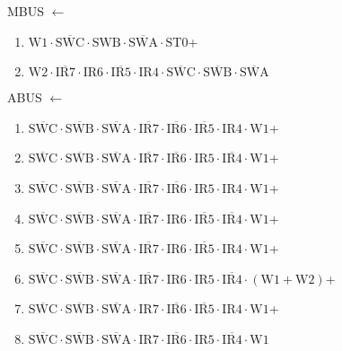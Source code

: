 \documentclass[UTF8]{ctexart}
\begin{document}
MBUS $\leftarrow$
\begin{enumerate}[\indent\indent]
	\item $\text{W1} \cdot \overline{\text{SWC}} \cdot \text{SWB} \cdot \overline{\text{SWA}} \cdot \text{ST0}$+
	\item $\text{W2} \cdot \overline{\text{IR7}} \cdot \text{IR6} \cdot \overline{\text{IR5}} \cdot \text{IR4} \cdot \overline{\text{SWC}} \cdot\overline{\text{SWB}}\cdot \overline{\text{SWA}}$
\end{enumerate}

ABUS $\leftarrow$
\begin{enumerate}[\indent\indent]
	\item $\overline{\text{SWC}} \cdot\overline{\text{SWB}}\cdot \overline{\text{SWA}} \cdot \overline{\text{IR7}} \cdot \overline{\text{IR6}} \cdot \overline{\text{IR5}} \cdot \text{IR4} \cdot \text{W1}$+
	\item $\overline{\text{SWC}} \cdot\overline{\text{SWB}}\cdot \overline{\text{SWA}} \cdot \overline{\text{IR7}} \cdot \overline{\text{IR6}} \cdot \text{IR5} \cdot \overline{\text{IR4}} \cdot \text{W1}$+
	\item $\overline{\text{SWC}} \cdot\overline{\text{SWB}}\cdot \overline{\text{SWA}} \cdot \overline{\text{IR7}} \cdot \overline{\text{IR6}} \cdot \text{IR5} \cdot \text{IR4} \cdot \text{W1}$+
	\item $\overline{\text{SWC}} \cdot\overline{\text{SWB}}\cdot \overline{\text{SWA}} \cdot \overline{\text{IR7}} \cdot \text{IR6} \cdot \overline{\text{IR5}} \cdot \overline{\text{IR4}} \cdot \text{W1}$+
	\item $\overline{\text{SWC}} \cdot\overline{\text{SWB}}\cdot \overline{\text{SWA}} \cdot \overline{\text{IR7}} \cdot \text{IR6} \cdot \overline{\text{IR5}} \cdot \text{IR4} \cdot \text{W1}$+
	\item $\overline{\text{SWC}} \cdot\overline{\text{SWB}}\cdot \overline{\text{SWA}} \cdot \overline{\text{IR7}} \cdot \text{IR6} \cdot \text{IR5} \cdot \overline{\text{IR4}} \cdot (\text{W1} + \text{W2})$+
	\item $\overline{\text{SWC}} \cdot\overline{\text{SWB}}\cdot \overline{\text{SWA}} \cdot \text{IR7} \cdot \overline{\text{IR6}} \cdot \overline{\text{IR5}} \cdot \text{IR4} \cdot \text{W1}$+
	\item $\overline{\text{SWC}} \cdot\overline{\text{SWB}}\cdot \overline{\text{SWA}} \cdot \text{IR7} \cdot \overline{\text{IR6}} \cdot \text{IR5} \cdot \overline{\text{IR4}} \cdot \text{W1}$
\end{enumerate}
\end{document}
